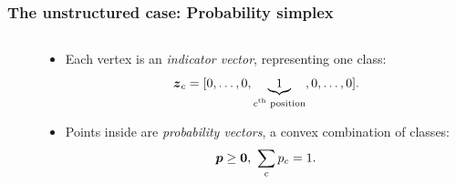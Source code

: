 \begin{frame}
\frametitle{The unstructured case: Probability simplex}

\begin{columns}[t]%
\begin{column}{.3\textwidth}%
%

\end{column}
\begin{column}{.5\textwidth}%
\begin{itemize}
\item<2-> Each vertex is an \emph{indicator vector}, representing one class:
\begin{equation*}
\boldsymbol{z}_c = [0, \ldots, 0, \underbrace{1}_{c\text{\textsuperscript{th} position}}, 0, \ldots, 0].
\end{equation*}
\item<3-> Points inside are \emph{probability vectors}, a convex combination of classes:
\begin{equation*}
\boldsymbol{p} \ge \mathbf{0}, \,\, \sum_c p_c = 1.
\end{equation*}
\end{itemize}
\end{column}
\end{columns}

\end{frame}%


